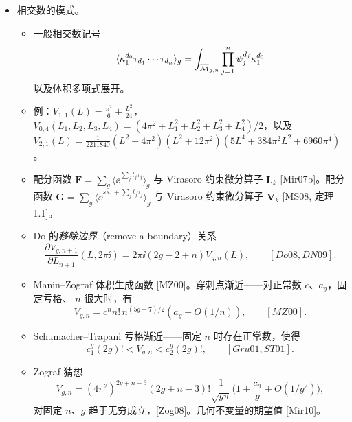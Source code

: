 \begin{itemize}[leftmargin=1.6em,itemsep=2pt,topsep=2pt]
\item 相交数的模式。
  \begin{itemize}[leftmargin=1.6em,itemsep=2pt,topsep=2pt]
  \item 一般相交数记号
    \[
    \langle\kappa_1^{d_0}\tau_{d_1}\cdots\tau_{d_n}\rangle_g
    =\int_{\overline{\mathcal{M}}_{g,n}}\prod_{j=1}^{n}\psi_j^{d_j}\kappa_1^{d_0}
    \]
    以及体积多项式展开。
  \item 例：$V_{1,1}(L)=\frac{\pi^2}{6}+\frac{L^2}{24}$，
    $V_{0,4}(L_1,L_2,L_3,L_4)=(4\pi^2+L_1^2+L_2^2+L_3^2+L_4^2)/2$，以及
    $V_{2,1}(L)=\frac{1}{2211840}(L^2+4\pi^2)(L^2+12\pi^2)
    (5L^4+384\pi^2L^2+6960\pi^4)$。
  \item 配分函数 $\mathbf{F}=\sum_g\big\langle \ee^{\sum_j t_j\tau_j}\big\rangle_g$ 与
    Virasoro 约束微分算子 $\mathbf{L}_k$ [Mir07b]。配分函数
    $\mathbf{G}=\sum_g\big\langle \ee^{s\kappa_1+\sum_j t_j\tau_j}\big\rangle_g$ 与
    Virasoro 约束微分算子 $\mathbf{V}_k$ [MS08, 定理 1.1]。
  \item Do 的\emph{移除边界}（remove a boundary）关系
    \[
    \frac{\partial V_{g,n+1}}{\partial L_{n+1}}(L,2\pi\ii)=2\pi\ii(2g-2+n)V_{g,n}(L),
    \qquad [Do08, DN09].
    \]
  \item Manin--Zograf 体积生成函数 [MZ00]。穿刺点渐近——对正常数 $c$、$a_g$，固定亏格、
    $n$ 很大时，有
    \[
    V_{g,n}=c^n n!\,n^{(5g-7)/2}(a_g+O(1/n)),\qquad [MZ00].
    \]
  \item Schumacher--Trapani 亏格渐近——固定 $n$ 时存在正常数，使得
    \[
    c_1^g(2g)!<V_{g,n}<c_2^g(2g)!,\qquad [Gru01, ST01].
    \]
  \item Zograf 猜想
    \[
    V_{g,n}=(4\pi^2)^{2g+n-3}(2g+n-3)!\frac{1}{\sqrt{g\pi}}
    \Big(1+\frac{c_n}{g}+O(1/g^2)\Big),
    \]
    对固定 $n$、$g$ 趋于无穷成立，[Zog08]。几何不变量的期望值 [Mir10]。
  \end{itemize}
\end{itemize}

%
